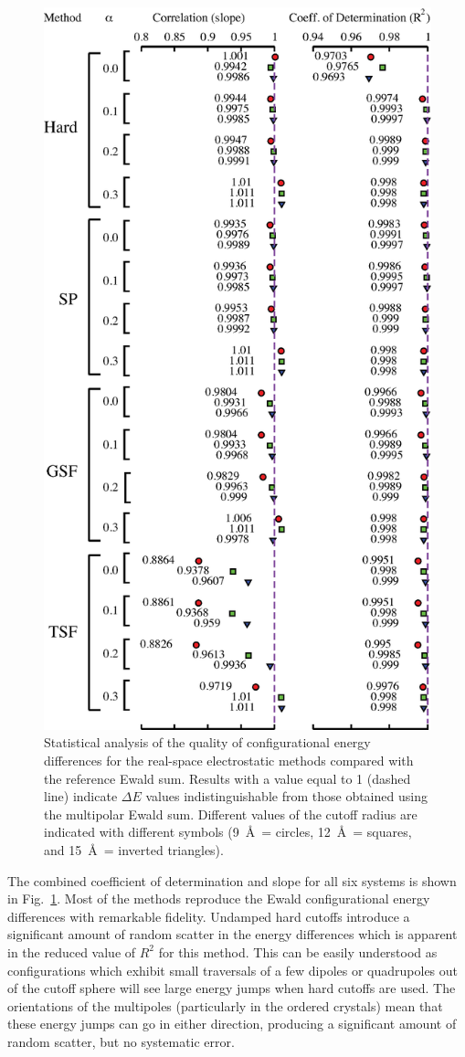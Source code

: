 \begin{figure}
  \centering
  \includegraphics[width=0.6\linewidth]{energyPlot_slopeCorrelation_combined.eps}
  \caption{Statistical analysis of the quality of configurational
    energy differences for the real-space electrostatic methods
    compared with the reference Ewald sum.  Results with a value equal
    to 1 (dashed line) indicate $\Delta E$ values indistinguishable
    from those obtained using the multipolar Ewald sum.  Different
    values of the cutoff radius are indicated with different symbols
    (9~\AA\ = circles, 12~\AA\ = squares, and 15~\AA\ = inverted
    triangles).\label{fig:slopeCorr_energy}}
\end{figure} 

The combined coefficient of determination and slope for all six
systems is shown in Fig.~\ref{fig:slopeCorr_energy}.  Most of the
methods reproduce the Ewald configurational energy differences with
remarkable fidelity.  Undamped hard cutoffs introduce a significant
amount of random scatter in the energy differences which is apparent
in the reduced value of $R^2$ for this method.  This can be easily
understood as configurations which exhibit small traversals of a few
dipoles or quadrupoles out of the cutoff sphere will see large energy
jumps when hard cutoffs are used.  The orientations of the multipoles
(particularly in the ordered crystals) mean that these energy jumps
can go in either direction, producing a significant amount of random
scatter, but no systematic error.

